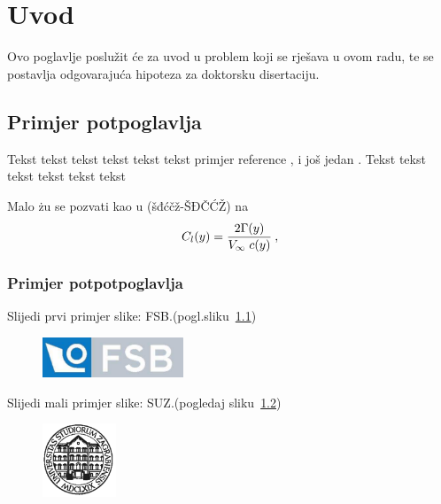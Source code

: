 \chapter{Uvod}

Ovo poglavlje poslu\v{z}it \'{c}e za uvod u problem koji se rje\v{s}ava u ovom
radu, te se postavlja odgovaraju\'{c}a hipoteza za doktorsku
disertaciju.

\section{Primjer potpoglavlja}
Tekst tekst tekst tekst tekst tekst primjer reference
\cite{mastersthesis-minimal}, i jo\v{s} jedan \cite{inbook-full}.
Tekst tekst tekst tekst tekst tekst 

Malo żu se pozvati kao u (šđćčž-ŠĐČĆŽ) na
\begin{equation}\label{eq:ls-1}
	C_l(y)=\frac{2\Gamma(y)}{\hbox{$V_{\infty}$}\;c(y)}\:,
\end{equation}
%

\subsection{Primjer potpotpoglavlja}

Slijedi prvi primjer slike: FSB.(pogl.sliku~\ref{fig1})
%

\begin{figure}[h]
  \centering
  \includegraphics[height=1.2cm]{fsb_logo}\\
  \label{fig1}
\end{figure}

\clearpage
Slijedi mali primjer slike: SUZ.(pogledaj sliku~\ref{fig2})
%

\begin{figure}
  \centering
  \includegraphics[height=2.2cm]{suz_grb}\\
  \label{fig2}
\end{figure}


